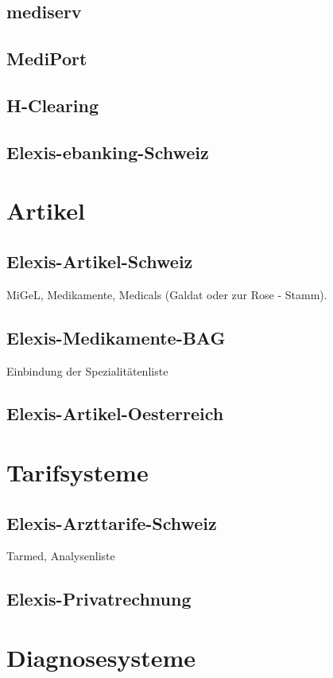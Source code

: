 \documentclass[paper=a4,BCOR8.25mm]{scrartcl}
\begin{document}
\subsection{mediserv}
\subsection{MediPort}
\subsection{H-Clearing}

\subsection{Elexis-ebanking-Schweiz}

\section{Artikel}
\subsection{Elexis-Artikel-Schweiz}
MiGeL, Medikamente, Medicals (Galdat oder zur Rose - Stamm).

\subsection{Elexis-Medikamente-BAG}
Einbindung der Spezialitätenliste
\subsection{Elexis-Artikel-Oesterreich}


\section{Tarifsysteme}
\subsection{Elexis-Arzttarife-Schweiz}
Tarmed, Analysenliste
\subsection{Elexis-Privatrechnung}


\section{Diagnosesysteme}
\end{document}
